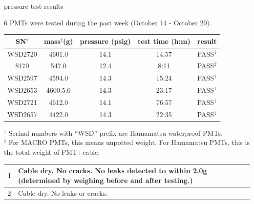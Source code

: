 \documentclass{beamer}
\begin{document}
\begin{frame}{pressure test results}
	\begin{center}
		\small
		6 PMTs were tested during the past week (October 14 - October 20).
	\end{center}
\begin{table}
\small
{}
\begin{tabular}{|c|c|c|c|c|}
	\hline
	SN$^\dagger$ & mass$^\ddag$(g) & pressure (psig) & test time (h:m) & result \\
	\hline
	WSD2720 & 4601.0 & 14.1 & 14:57 & PASS$^1$ \\
	\hline
	8170 & 547.0 & 12.4 & 8:11 & PASS$^2$ \\
	\hline
	WSD2597 & 4594.0 & 14.3 & 15:24 & PASS$^1$ \\
	\hline
	WSD2653 & 4600.5.0 & 14.3 & 23:17 & PASS$^1$ \\
	\hline
	WSD2721 & 4612.0 & 14.1 & 76:57 & PASS$^1$ \\
	\hline
	WSD2657 & 4422.0 & 14.3 & 22:35 & PASS$^1$ \\
	\hline
\end{tabular}
\end{table}
	\scriptsize
	$^\dagger$ Serinal numbers with ``WSD'' prefix are Hamamatsu waterproof PMTs. \\
	$^\ddag$ For MACRO PMTs, this means unpotted weight. For Hamamatsu PMTs, this is the total
			weight of PMT+cable.
	\setlength{\tabcolsep}{2pt}
	\scriptsize
	\begin{table}
		\begin{tabular}{|c|p{3.5in}|}
		\hline
		1 & Cable dry. No cracks. No leaks detected to within 2.0g
		    (determined by weighing before and after testing.)\\
		\hline
		2 & Cable dry. No leaks or cracks. \\
		\hline
		\end{tabular}
	\end{table}
\end{frame}
\end{document}
